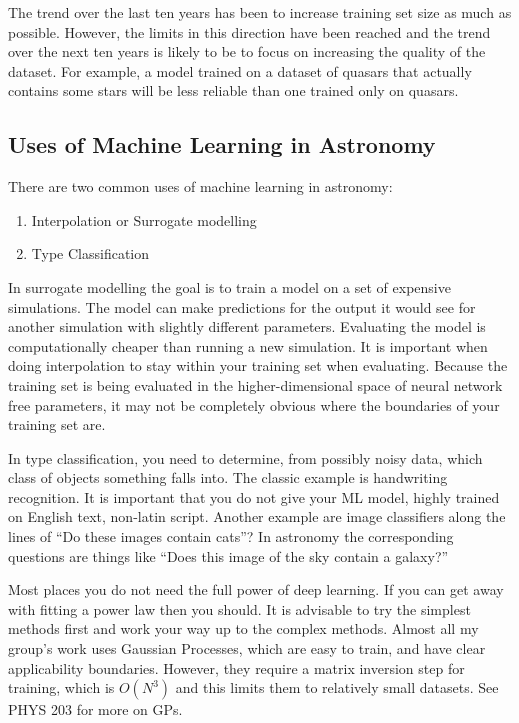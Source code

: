 \documentclass[12pt]{article}
\begin{document}
The trend over the last ten years has been to increase training set size as much as possible. However, the limits in this direction have been reached and the trend over the next ten years is likely to be to focus on increasing the quality of the dataset. For example, a model trained on a dataset of quasars that actually contains some stars will be less reliable than one trained only on quasars.

\subsection{Uses of Machine Learning in Astronomy}

There are two common uses of machine learning in astronomy:
\begin{enumerate}
 \item Interpolation or Surrogate modelling
 \item Type Classification
\end{enumerate}

In surrogate modelling the goal is to train a model on a set of expensive simulations. The model can make predictions for the output it would see for another simulation with slightly different parameters. Evaluating the model is computationally cheaper than running a new simulation. It is important when doing interpolation to stay within your training set when evaluating. Because the training set is being evaluated in the higher-dimensional space of neural network free parameters, it may not be completely obvious where the boundaries of your training set are.

In type classification, you need to determine, from possibly noisy data, which class of objects something falls into. The classic example is handwriting recognition. It is important that you do not give your ML model, highly trained on English text, non-latin script. Another example are image classifiers along the lines of ``Do these images contain cats''? In astronomy the corresponding questions are things like ``Does this image of the sky contain a galaxy?''

Most places you do not need the full power of deep learning. If you can get away with fitting a power law then you should. It is advisable to try the simplest methods first and work your way up to the complex methods. Almost all my group's work uses Gaussian Processes, which are easy to train, and have clear applicability boundaries. However, they require a matrix inversion step for training, which is $O(N^3)$ and this limits them to relatively small datasets. See PHYS 203 for more on GPs.
\end{document}
